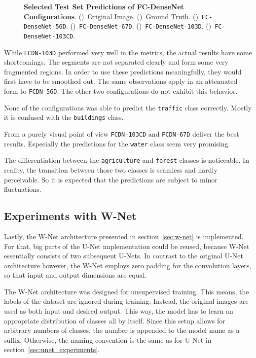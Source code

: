 \begin{figure}[h]
    \caption[Selected Test Set Predictions of FC-DenseNet Configurations]
    {\textbf{Selected Test Set Predictions of FC-DenseNet Configurations}.
    ()~Original Image.
    ()~Ground Truth.
    ()~\texttt{FC-DenseNet-56D}.
    ()~\texttt{FC-DenseNet-67D}.
    ()~\texttt{FC-DenseNet-103D}.
    ()~\texttt{FC-DenseNet-103CD}.}
    \label{fig:densenet_prediction_images}
\end{figure}

While \texttt{FCDN-103D} performed very well in the metrics, the actual results have some shortcomings. The segments are not separated clearly and form some very fragmented regions. In order to use these predictions meaningfully, they would first have to be smoothed out. The same observations apply in an attenuated form to \texttt{FCDN-56D}. The other two configurations do not exhibit this behavior.

None of the configurations was able to predict the \texttt{traffic} class correctly. Mostly it is confused with the \texttt{buildings} class.

From a purely visual point of view \texttt{FCDN-103CD} and \texttt{FCDN-67D} deliver the best results. Especially the predictions for the \texttt{water} class seem very promising.

The differentiation between the \texttt{agriculture} and \texttt{forest} classes is noticeable. In reality, the transition between those two classes is seamless and hardly perceivable. So it is expected that the predictions are subject to minor fluctuations.

\subsection{Experiments with W-Net}
\label{sec:wnet_experiments}
Lastly, the W-Net architecture presented in section~\ref{sec:w-net} is implemented. For that, big parts of the U-Net implementation could be reused, because W-Net essentially consists of two subsequent U-Nets. In contrast to the original U-Net architecture however, the W-Net employs zero padding for the convolution layers, so that input and output dimensions are equal.

The W-Net architecture was designed for unsupervised training. This means, the labels of the dataset are ignored during training. Instead, the original images are used as both input and desired output. This way, the model has to learn an appropriate distribution of classes all by itself. Since this setup allows for arbitrary numbers of classes, the number is appended to the model name as a suffix. Otherwise, the naming convention is the same as for U-Net in section~\ref{sec:unet_experiments}.

